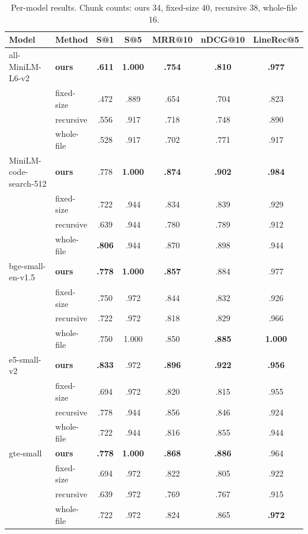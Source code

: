 \documentclass[conference]{IEEEtran}
\begin{document}
\begin{table}[t]
\caption{Per-model results. Chunk counts: ours 34, fixed-size 40, recursive 38, whole-file 16.}
\label{tab:permodel}
\centering
\begin{tabular}{llccccc}
\toprule
Model & Method & S@1 & S@5 & MRR@10 & nDCG@10 & LineRec@5 \\
\midrule
all-MiniLM-L6-v2 & \textbf{ours} & \textbf{.611} & \textbf{1.000} & \textbf{.754} & \textbf{.810} & \textbf{.977} \\
 & fixed-size & .472 & .889 & .654 & .704 & .823 \\
 & recursive & .556 & .917 & .718 & .748 & .890 \\
 & whole-file & .528 & .917 & .702 & .771 & .917 \\
\midrule
MiniLM-code-search-512 & \textbf{ours} & .778 & \textbf{1.000} & \textbf{.874} & \textbf{.902} & \textbf{.984} \\
 & fixed-size & .722 & .944 & .834 & .839 & .929 \\
 & recursive & .639 & .944 & .780 & .789 & .912 \\
 & whole-file & \textbf{.806} & .944 & .870 & .898 & .944 \\
\midrule
bge-small-en-v1.5 & \textbf{ours} & \textbf{.778} & \textbf{1.000} & \textbf{.857} & .884 & .977 \\
 & fixed-size & .750 & .972 & .844 & .832 & .926 \\
 & recursive & .722 & .972 & .818 & .829 & .966 \\
 & whole-file & .750 & 1.000 & .850 & \textbf{.885} & \textbf{1.000} \\
\midrule
e5-small-v2 & \textbf{ours} & \textbf{.833} & .972 & \textbf{.896} & \textbf{.922} & \textbf{.956} \\
 & fixed-size & .694 & .972 & .820 & .815 & .955 \\
 & recursive & .778 & .944 & .856 & .846 & .924 \\
 & whole-file & .722 & .944 & .816 & .855 & .944 \\
\midrule
gte-small & \textbf{ours} & \textbf{.778} & \textbf{1.000} & \textbf{.868} & \textbf{.886} & .964 \\
 & fixed-size & .694 & .972 & .822 & .805 & .922 \\
 & recursive & .639 & .972 & .769 & .767 & .915 \\
 & whole-file & .722 & .972 & .824 & .865 & \textbf{.972} \\
\bottomrule
\end{tabular}
\end{table}
\end{document}
